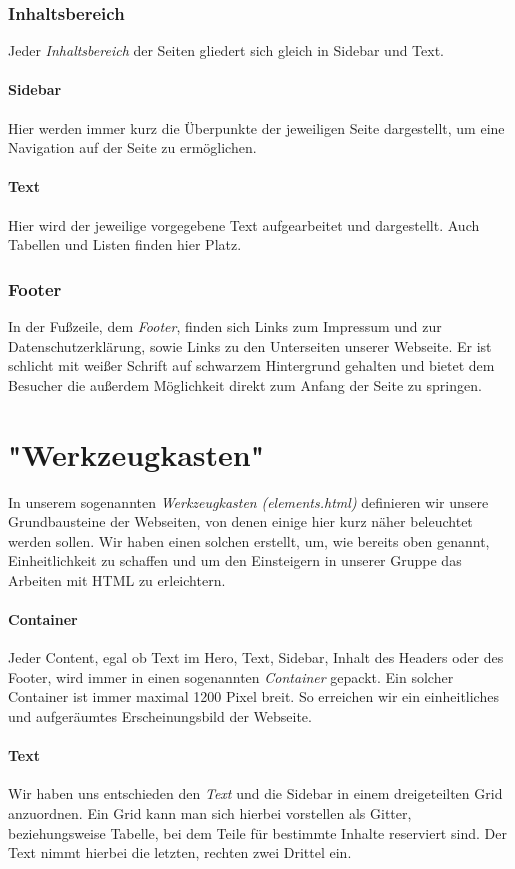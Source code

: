 \documentclass[12pt,a4paper]{article}
\begin{document}
\subsubsection{Inhaltsbereich}
Jeder \textit{Inhaltsbereich} der Seiten gliedert sich gleich in
Sidebar und Text.
\paragraph{Sidebar}
Hier werden immer kurz die Überpunkte der jeweiligen Seite dargestellt, um eine Navigation auf der Seite zu ermöglichen.
\paragraph{Text}
Hier wird der jeweilige vorgegebene Text aufgearbeitet und dargestellt. Auch Tabellen und Listen finden hier Platz.
\subsubsection{Footer}
In der Fußzeile, dem \textit{Footer}, finden sich Links zum Impressum und zur Datenschutzerklärung, sowie Links zu den Unterseiten unserer Webseite. Er ist schlicht mit weißer Schrift auf schwarzem Hintergrund gehalten und bietet dem Besucher die außerdem Möglichkeit direkt zum Anfang der Seite zu springen.
\section{"Werkzeugkasten"}
In unserem sogenannten \textit{Werkzeugkasten} \emph{(elements.html)} definieren wir unsere Grundbausteine der Webseiten, von denen einige hier kurz näher beleuchtet werden sollen. Wir haben einen solchen erstellt, um, wie bereits oben genannt, Einheitlichkeit zu schaffen und um den Einsteigern in unserer Gruppe das Arbeiten mit HTML zu erleichtern.
\paragraph{Container}
Jeder Content, egal ob Text im Hero, Text, Sidebar, Inhalt des Headers oder des Footer, wird immer in einen sogenannten \textit{Container} gepackt.
Ein solcher Container ist immer maximal 1200 Pixel breit. So erreichen wir ein einheitliches und aufgeräumtes Erscheinungsbild der Webseite.
\paragraph{Text}
Wir haben uns entschieden den \textit{Text} und die Sidebar in einem dreigeteilten Grid  anzuordnen. Ein Grid kann man sich hierbei vorstellen als Gitter, beziehungsweise Tabelle, bei dem Teile für bestimmte Inhalte reserviert sind. Der Text nimmt hierbei die letzten, rechten zwei Drittel ein.
\end{document}
